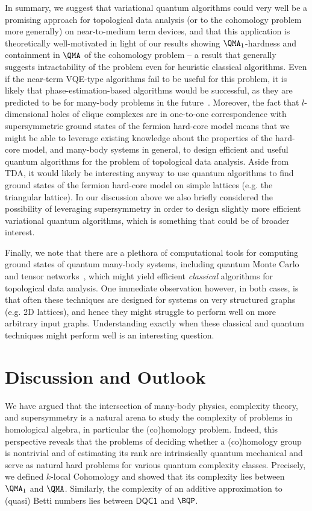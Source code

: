 \documentclass[11pt]{article}
\numberwithin{equation}{section}
\newcommand{\DQC}{\mathsf{DQC1}}
\renewcommand\( {\left(}
\renewcommand\) {\right)}
\begin{document}
In summary, we suggest that variational quantum algorithms could very well be a promising approach for topological data analysis (or to the cohomology problem more generally) on near-to-medium term devices, and that this application is theoretically well-motivated in light of our results showing $\QMA_1$-hardness and containment in $\QMA$ of the cohomology problem -- a result that generally suggests intractability of the problem even for heuristic classical algorithms. Even if the near-term VQE-type algorithms fail to be useful for this problem, it is likely that phase-estimation-based algorithms would be successful, as they are predicted to be for many-body problems in the future~\cite{von2020quantum}. Moreover, the fact that $l$-dimensional holes of clique complexes are in one-to-one correspondence with supersymmetric ground states of the fermion hard-core model means that we might be able to leverage existing knowledge about the properties of the hard-core model, and many-body systems in general, to design efficient and useful quantum algorithms for the problem of topological data analysis. Aside from TDA, it would likely be interesting anyway to use quantum algorithms to find ground states of the fermion hard-core model on simple lattices (e.g. the triangular lattice). In our discussion above we also briefly considered the possibility of leveraging supersymmetry in order to design slightly more efficient variational quantum algorithms, which is something that could be of broader interest. 

Finally, we note that there are a plethora of computational tools for computing ground states of quantum many-body systems, including quantum Monte Carlo and tensor networks~\cite{leblanc2015solutions}, which might yield efficient \emph{classical} algorithms for topological data analysis. One immediate observation however, in both cases, is that often these techniques are designed for systems on very structured graphs (e.g. 2D lattices), and hence they might struggle to perform well on more arbitrary input graphs. Understanding exactly when these classical and quantum techniques might perform well is an interesting question.


\section{Discussion and Outlook}
\label{Discussion and Outlook}

We have argued that the intersection of many-body physics, complexity theory, and supersymmetry is a natural arena to study the complexity of problems in homological algebra, in particular the (co)homology problem. Indeed, this perspective reveals that the problems of deciding whether a (co)homology group is nontrivial and of estimating its rank are intrinsically quantum mechanical and serve as natural hard problems for various quantum complexity classes. Precisely, we defined {\sc $k$-local Cohomology} and showed that its complexity lies  between $\QMA_{1}$ and $\QMA$. Similarly, the complexity of an additive approximation to (quasi) Betti numbers lies  between  $\DQC$ and $\BQP$. 
\end{document}
